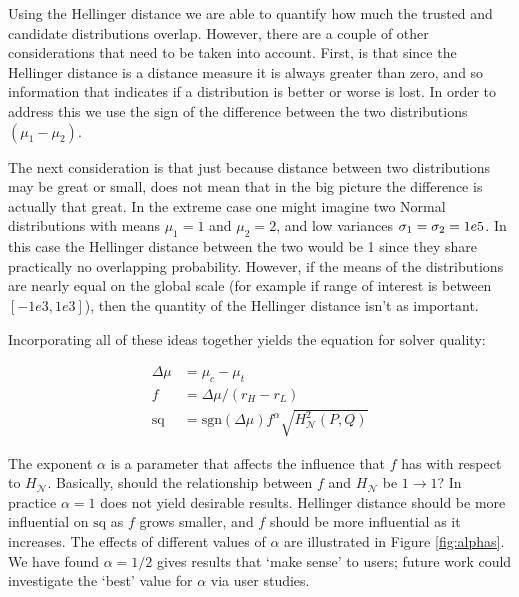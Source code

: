 Using the Hellinger distance we are able to quantify how much the trusted and candidate distributions overlap. However, there are a couple of other considerations that need to be taken into account. First, is that since the Hellinger distance is a distance measure it is always greater than zero, and so information that indicates if a distribution is better or worse is lost. In order to address this we use the sign of the difference between the two distributions $(\mu_1-\mu_2)$.

The next consideration is that just because distance between two distributions may be great or small, does not mean that in the big picture the difference is actually that great. In the extreme case one might imagine two Normal distributions with means $\mu_1=1$ and $\mu_2=2$, and low variances $\sigma_1=\sigma_2=1e\-5$. In this case the Hellinger distance between the two would be 1 since they share practically no overlapping probability. However, if the means of the distributions are nearly equal on the global scale (for example if range of interest is between $[-1e3,1e3]$), then the quantity of the Hellinger distance isn't as important.

Incorporating all of these ideas together yields the equation for solver quality:

\begin{align}
    \Delta \mu &= \mu_c-\mu_t\\
    f &= \Delta \mu/(r_H-r_L) \label{eq:f}\\
    \text{sq} &= \text{sgn}(\Delta \mu)f^{\alpha}\sqrt{H_{\mathcal{N}}^{2}(P,Q)} \label{eq:sq}
\end{align}

The exponent $\alpha$ is a parameter that affects the influence that $f$ has with respect to $H_{\mathcal{N}}$. Basically, should the relationship between $f$ and $H_{\mathcal{N}}$ be $1\to1$? In practice $\alpha=1$ does not yield desirable results. Hellinger distance should be more influential on $\text{sq}$ as $f$ grows smaller, and $f$ should be more influential as it increases. The effects of different values of $\alpha$ are illustrated in Figure \ref{fig:alphas}. We have found $\alpha=1/2$ gives results that `make sense' to users; future work could investigate the `best' value for $\alpha$ via user studies.

